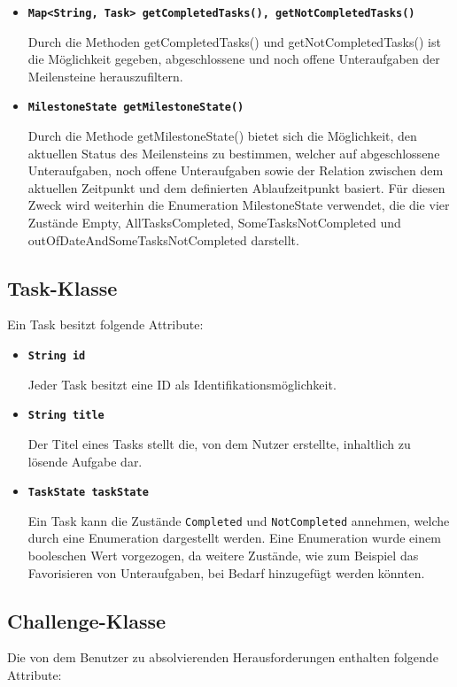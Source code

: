 \documentclass[bibliography=totoc,listof=totoc,BCOR=5mm,DIV=12,oneside]{scrbook}
\begin{document}
{\begin{itemize}
\item[] \texttt{\textbf{Map<String, Task> getCompletedTasks(), getNotCompletedTasks()}}
\par Durch die Methoden getCompletedTasks() und getNotCompletedTasks() ist die Möglichkeit gegeben, abgeschlossene und noch offene Unteraufgaben der Meilensteine herauszufiltern.

\item[] \texttt{\textbf{MilestoneState getMilestoneState()}}
\par Durch die Methode getMilestoneState() bietet sich die Möglichkeit, den aktuellen Status des Meilensteins zu bestimmen, welcher auf abgeschlossene Unteraufgaben, noch offene Unteraufgaben sowie der Relation zwischen dem aktuellen Zeitpunkt und dem definierten Ablaufzeitpunkt basiert. Für diesen Zweck wird weiterhin die Enumeration MilestoneState verwendet, die die vier Zustände Empty, AllTasksCompleted, SomeTasksNotCompleted und outOfDateAndSomeTasksNotCompleted darstellt.
\end{itemize}

\newpage

\subsection{Task-Klasse}
\par Ein Task besitzt folgende Attribute:

\begin{itemize}
\item[] \texttt{\textbf{String id}}
\par Jeder Task besitzt eine ID als Identifikationsmöglichkeit.

\item[] \texttt{\textbf{String title}}
\par Der Titel eines Tasks stellt die, von dem Nutzer erstellte, inhaltlich zu lösende Aufgabe dar.

\item[] \texttt{\textbf{TaskState taskState}}
\par Ein Task kann die Zustände \texttt{Completed} und \texttt{NotCompleted} annehmen, welche durch eine Enumeration dargestellt werden. Eine Enumeration wurde einem booleschen Wert vorgezogen, da weitere Zustände, wie zum Beispiel das Favorisieren von Unteraufgaben, bei Bedarf hinzugefügt werden könnten.
\end{itemize}

\subsection{Challenge-Klasse}
Die von dem Benutzer zu absolvierenden Herausforderungen enthalten folgende Attribute:

}
\end{document}
